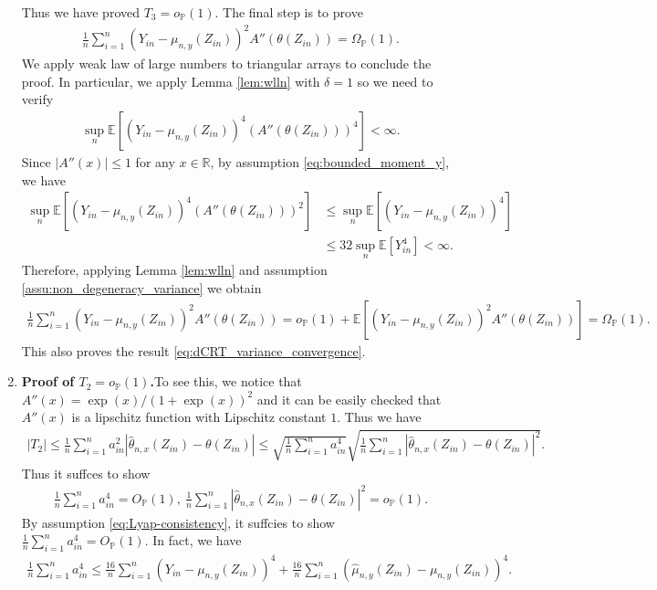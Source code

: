 \documentclass[12pt]{article}
\theoremstyle{definition}
\def\P{\mathbb{P}}
\def\P{\mathbb{P}}
\newcommand{\E}{\mathbb E}								%
\renewcommand{\P}{\mathbb{P}}							%
\newcommand{\srz}{Z}									%
\newcommand{\sry}{Y}									%
\begin{document}
\begin{enumerate}
	Thus we have proved $T_3=o_{\P}(1)$. The final step is to prove 
	\begin{align*}
		\frac{1}{n}\sum_{i=1}^n (\sry_{in}-\mu_{n,y}(\srz_{in}))^2A''(\theta(\srz_{in}))=\Omega_{\P}(1).
	\end{align*}
	We apply weak law of large numbers to triangular arrays to conclude the proof. In particular, we apply Lemma \ref{lem:wlln} with $\delta=1$ so we need to verify 
	\begin{align*}
		\sup_n\E[(\sry_{in}-\mu_{n,y}(\srz_{in}))^4(A''(\theta(\srz_{in})))^4]<\infty.
	\end{align*}
	Since $|A''(x)|\leq 1$ for any $x\in\mathbb{R}$, by assumption \eqref{eq:bounded_moment_y}, we have
	\begin{align*}
		\sup_n\E[(\sry_{in}-\mu_{n,y}(\srz_{in}))^4(A''(\theta(\srz_{in})))^2]
		&
		\leq \sup_n\E[(\sry_{in}-\mu_{n,y}(\srz_{in}))^4]\\
		&
		\leq 32\sup_n\E[\sry_{in}^4]<\infty.
	\end{align*} 
	Therefore, applying Lemma \ref{lem:wlln} and assumption \ref{assu:non_degeneracy_variance} we obtain 
	\begin{align*}
		\frac{1}{n}\sum_{i=1}^n (\sry_{in}-\mu_{n,y}(\srz_{in}))^2A''(\theta(\srz_{in}))=o_{\P}(1)+\E[(\sry_{in}-\mu_{n,y}(\srz_{in}))^2A''(\theta(\srz_{in}))]=\Omega_{\P}(1).
	\end{align*}
  This also proves the result \eqref{eq:dCRT_variance_convergence}.
		\item \textbf{Proof of $T_2=o_\P(1)$.}To see this, we notice that $A''(x)=\exp(x)/ (1+\exp(x))^2$ and it can be easily checked that $A''(x)$ is a lipschitz function with Lipschitz constant $1$. Thus we have
		\begin{align*}
			|T_2|\leq \frac{1}{n}\sum_{i=1}^n a_{in}^2|\widehat \theta_{n,x}(\srz_{in})-\theta(\srz_{in})|\leq \sqrt{\frac{1}{n}\sum_{i=1}^n a_{in}^4}\sqrt{\frac{1}{n}\sum_{i=1}^n |\widehat \theta_{n,x}(\srz_{in})-\theta(\srz_{in})|^2}.
		\end{align*}
		Thus it suffces to show 
		\begin{align}
			\frac{1}{n}\sum_{i=1}^n a_{in}^4=O_{\P}(1),\ \frac{1}{n}\sum_{i=1}^n |\widehat \theta_{n,x}(\srz_{in})-\theta(\srz_{in})|^2=o_{\P}(1).\label{eq:fourth_moment_a}
		\end{align}
		By assumption \eqref{eq:Lyap-consistency}, it suffcies to show $\frac{1}{n}\sum_{i=1}^n a_{in}^4=O_{\P}(1)$. In fact, we have
		\begin{align*}
			\frac{1}{n}\sum_{i=1}^n a_{in}^4\leq \frac{16}{n}\sum_{i=1}^n (\sry_{in}-\mu_{n,y}(\srz_{in}))^4+\frac{16}{n}\sum_{i=1}^n (\widehat{\mu}_{n,y}(\srz_{in})-\mu_{n,y}(\srz_{in}))^4.

\end{align*}
\end{enumerate}
\end{document}
